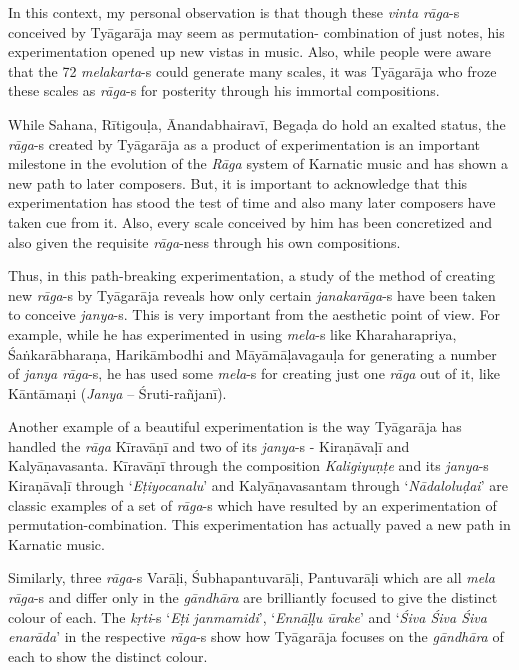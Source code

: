 In this context, my personal observation is that though these \textit{vinta rāga}-s conceived by Tyāgarāja may seem as permutation- combination of just notes, his experimentation opened up new vistas in music. Also, while people were aware that the 72 \textit{melakarta}-s could generate many scales, it was Tyāgarāja who froze these scales as \textit{rāga}-s for posterity through his immortal compositions.

While Sahana, Rītigouḷa, Ānandabhairavī, Begaḍa do hold an exalted status, the \textit{rāga}-s created by Tyāgarāja as a product of experimentation is an important milestone in the evolution of the \textit{Rāga} system of Karnatic music and has shown a new path to later composers. But, it is important to acknowledge that this experimentation has stood the test of time and also many later composers have taken cue from it. Also, every scale conceived by him has been concretized and also given the requisite \textit{rāga}-ness through his own compositions.

Thus, in this path-breaking experimentation, a study of the method of creating new \textit{rāga}-s by Tyāgarāja reveals how only certain \textit{janaka\break rāga}-s have been taken to conceive \textit{janya}-s. This is very important from the aesthetic point of view. For example, while he has experimented in using \textit{mela}-s like Kharaharapriya, Śaṅkarābharaṇa, Harikāmbodhi and Māyāmāḷavagauḷa for generating a number of \textit{janya rāga}-s, he has used some \textit{mela}-s for creating just one \textit{rāga} out of it, like Kāntāmaṇi (\textit{Janya} – Śruti-rañjanī).

Another example of a beautiful experimentation is the way Tyāgarāja has handled the \textit{rāga} Kīravāṇī and two of its \textit{janya}-s - Kiraṇāvaḷī and Kalyāṇavasanta. Kīravāṇī through the composition \textit{Kaligiyuṇṭe} and its \textit{janya}-s Kiraṇāvaḷī through ‘\textit{Eṭiyocanalu}’ and Kalyāṇavasantam through ‘\textit{Nādaloluḍai}’ are classic examples of a set of \textit{rāga}-s which have resulted by an experimentation of permutation-combination. This experimentation has actually paved a new path in Karnatic music.

Similarly, three \textit{rāga}-s Varāḷi, Śubhapantuvarāḷi, Pantuvarāḷi which are all \textit{mela rāga}-s and differ only in the \textit{gāndhāra} are brilliantly focused to give the distinct colour of each. The \textit{kṛti}-s ‘\textit{Eṭi janmamidi}’, ‘\textit{Ennāḷḷu ūrake}’ and ‘\textit{Śiva Śiva Śiva enarāda}’ in the respective \textit{rāga}-s show how Tyāgarāja focuses on the \textit{gāndhāra} of each to show the distinct colour.

